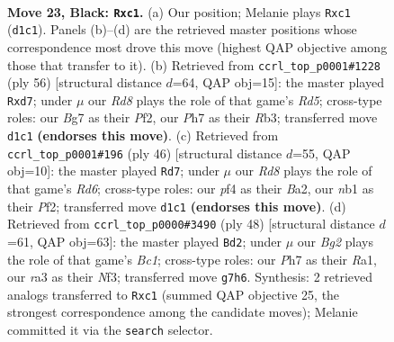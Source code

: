 \documentclass[11pt]{article}
\begin{document}
\clearpage

\begin{figure}[p]\centering
\begin{subfigure}{0.46\textwidth}\centering
\resizebox{\linewidth}{!}{%
\newchessgame
\chessboard[
  setfen={r5k1/P1p3bp/1p4p1/5p1n/4pP1P/R5PB/4R2K/1NBr4 b - - 2 23},
  showmover=false,
  pgfstyle=straightmove, color=movearrow, markmove={d1-c1}
]}
\caption{}
\end{subfigure}\hfill
\begin{subfigure}{0.46\textwidth}\centering
\resizebox{\linewidth}{!}{%
\newchessgame
\chessboard[
  setfen={5rk1/3bbpp1/2n4p/3Rp3/r3P2P/1R2B1P1/5P1N/6K1 w - - 0 29},
  showmover=false,
  pgfstyle=straightmove, color=movearrow, markmove={d5-d7}
]}
\caption{}
\end{subfigure}
\\[4pt]
\begin{subfigure}{0.46\textwidth}\centering
\resizebox{\linewidth}{!}{%
\newchessgame
\chessboard[
  setfen={2r1r1k1/pb3p1n/1p1Rp2p/4P1p1/8/P1N3P1/BP3PP1/4R1K1 w - - 3 24},
  showmover=false,
  pgfstyle=straightmove, color=movearrow, markmove={d6-d7}
]}
\caption{}
\end{subfigure}\hfill
\begin{subfigure}{0.46\textwidth}\centering
\resizebox{\linewidth}{!}{%
\newchessgame
\chessboard[
  setfen={r5k1/2p3p1/3bRn1p/p7/2rP4/2P2N1P/5PP1/R1B3K1 w - - 1 25},
  showmover=false,
  pgfstyle=straightmove, color=movearrow, markmove={c1-d2}
]}
\caption{}
\end{subfigure}
\caption{\textbf{Move 23, Black: \texttt{Rxc1}.} (a) Our position; Melanie plays \texttt{Rxc1} (\texttt{d1c1}). Panels (b)--(d) are the retrieved master positions whose correspondence most drove this move (highest QAP objective among those that transfer to it). (b) Retrieved from \texttt{ccrl\_top\_p0001\#1228} (ply 56) [structural distance $d$=64, QAP obj=15]: the master played \texttt{Rxd7}; under $\mu$ our \emph{Rd8} plays the role of that game's \emph{Rd5}; cross-type roles: our \emph{B}g7 as their \emph{P}f2, our \emph{P}h7 as their \emph{R}b3; transferred move \texttt{d1c1} \textbf{(endorses this move)}. (c) Retrieved from \texttt{ccrl\_top\_p0001\#196} (ply 46) [structural distance $d$=55, QAP obj=10]: the master played \texttt{Rd7}; under $\mu$ our \emph{Rd8} plays the role of that game's \emph{Rd6}; cross-type roles: our \emph{p}f4 as their \emph{B}a2, our \emph{n}b1 as their \emph{P}f2; transferred move \texttt{d1c1} \textbf{(endorses this move)}. (d) Retrieved from \texttt{ccrl\_top\_p0000\#3490} (ply 48) [structural distance $d$=61, QAP obj=63]: the master played \texttt{Bd2}; under $\mu$ our \emph{Bg2} plays the role of that game's \emph{Bc1}; cross-type roles: our \emph{P}h7 as their \emph{R}a1, our \emph{r}a3 as their \emph{N}f3; transferred move \texttt{g7h6}. Synthesis: 2 retrieved analogs transferred to \texttt{Rxc1} (summed QAP objective 25, the strongest correspondence among the candidate moves); Melanie committed it via the \texttt{search} selector.}
\label{fig:thought-m45}
\end{figure}
\end{document}
